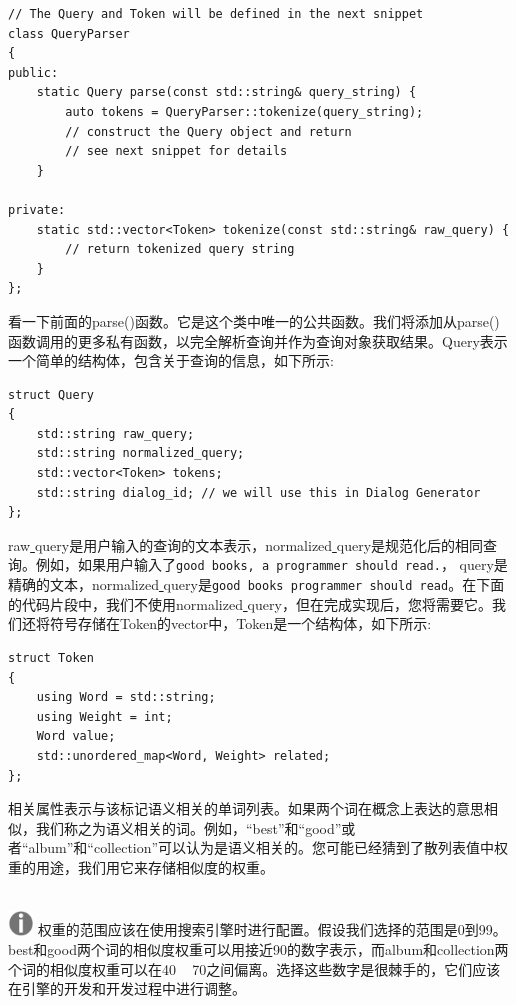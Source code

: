 \begin{lstlisting}[caption={}]
// The Query and Token will be defined in the next snippet
class QueryParser
{
public:
	static Query parse(const std::string& query_string) {
		auto tokens = QueryParser::tokenize(query_string);
		// construct the Query object and return
		// see next snippet for details
	}

private:
	static std::vector<Token> tokenize(const std::string& raw_query) {
		// return tokenized query string
	}
};
\end{lstlisting}

看一下前面的parse()函数。它是这个类中唯一的公共函数。我们将添加从parse()函数调用的更多私有函数，以完全解析查询并作为查询对象获取结果。Query表示一个简单的结构体，包含关于查询的信息，如下所示: \par

\begin{lstlisting}[caption={}]
struct Query
{
	std::string raw_query;
	std::string normalized_query;
	std::vector<Token> tokens;
	std::string dialog_id; // we will use this in Dialog Generator
};
\end{lstlisting}

raw\underline{ }query是用户输入的查询的文本表示，normalized\underline{ }query是规范化后的相同查询。例如，如果用户输入了\texttt{good books, a programmer should read.}， \underline{ }query是精确的文本，normalized\underline{ }query是\texttt{good books programmer should read}。在下面的代码片段中，我们不使用normalized\underline{ }query，但在完成实现后，您将需要它。我们还将符号存储在Token的vector中，Token是一个结构体，如下所示: \par

\begin{lstlisting}[caption={}]
struct Token
{
	using Word = std::string;
	using Weight = int;
	Word value;
	std::unordered_map<Word, Weight> related;
};
\end{lstlisting}

相关属性表示与该标记语义相关的单词列表。如果两个词在概念上表达的意思相似，我们称之为语义相关的词。例如，“best”和“good”或者“album”和“collection”可以认为是语义相关的。您可能已经猜到了散列表值中权重的用途，我们用它来存储相似度的权重。\par

\hspace*{\fill} \\ %
\includegraphics[width=0.05\textwidth]{images/warn}
权重的范围应该在使用搜索引擎时进行配置。假设我们选择的范围是0到99。best和good两个词的相似度权重可以用接近90的数字表示，而album和collection两个词的相似度权重可以在40 ~ 70之间偏离。选择这些数字是很棘手的，它们应该在引擎的开发和开发过程中进行调整。 \par
\noindent\textbf{}\ \par

